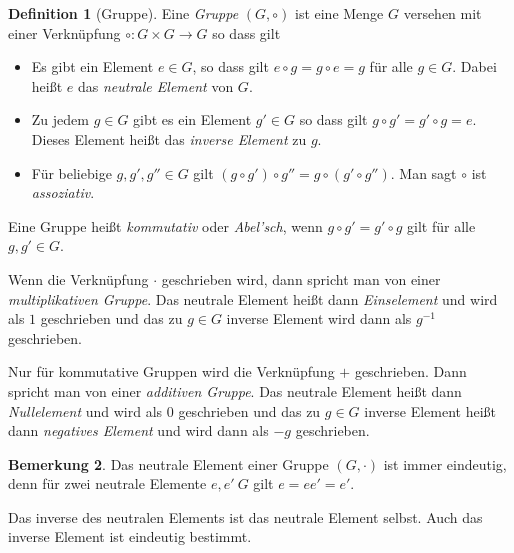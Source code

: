 \documentclass[index=totoc]{scrartcl}%
\theoremstyle{definition}
\newtheorem{defi}{Definition}[section]
\newtheorem{bem}[defi]{Bemerkung}
\begin{document}
\begin{defi}[Gruppe]
   
  Eine {\em Gruppe} $(G,\circ)$ ist eine Menge $G$
  versehen mit einer Verknüpfung $\circ\colon G\times G\to G$
  so dass gilt
  \begin{itemize}
  \item
    Es gibt ein Element $e\in G$, so dass gilt $e\circ g=g\circ e=g$
    für alle $g\in G$.
    Dabei heißt $e$ das {\em neutrale Element} von $G$.
  \item
    Zu jedem $g\in G$ gibt es ein Element $g'\in G$
    so dass gilt $g\circ g'=g'\circ g=e$.
    Dieses Element heißt das {\em inverse Element} zu $g$. 
  \item
    Für beliebige $g,g', g''\in G$ gilt
    $(g\circ g')\circ g''=g\circ (g'\circ g'')$.
    Man sagt $\circ$ ist {\em assoziativ}. 
  \end{itemize}

  Eine Gruppe heißt {\em kommutativ} oder {\em Abel'sch},
  wenn $g\circ g'=g'\circ g$ gilt für alle $g, g'\in G$.

  Wenn die Verknüpfung $\cdot$ geschrieben wird,
  dann spricht man von einer {\em multiplikativen Gruppe}.
  Das neutrale Element heißt dann {\em Einselement} und wird als $1$ geschrieben
  und das zu $g\in G$ inverse Element wird dann als $g^{-1}$ geschrieben.

  Nur für kommutative Gruppen wird die Verknüpfung $+$ geschrieben.
  Dann spricht man von einer {\em additiven Gruppe}.
  Das neutrale Element heißt dann {\em Nullelement} und wird als $0$ geschrieben
  und das zu $g\in G$ inverse Element heißt dann {\em negatives Element}
  und wird dann als $-g$ geschrieben.
\end{defi}

\begin{bem}
  Das neutrale Element einer Gruppe $(G, \cdot)$ ist immer eindeutig,
  denn für zwei neutrale Elemente $e,e'\ G$ gilt $e=ee'=e'$.
  
  Das inverse des neutralen Elements ist das neutrale Element selbst.
  Auch das inverse Element ist eindeutig bestimmt.
\end{bem}
\end{document}
